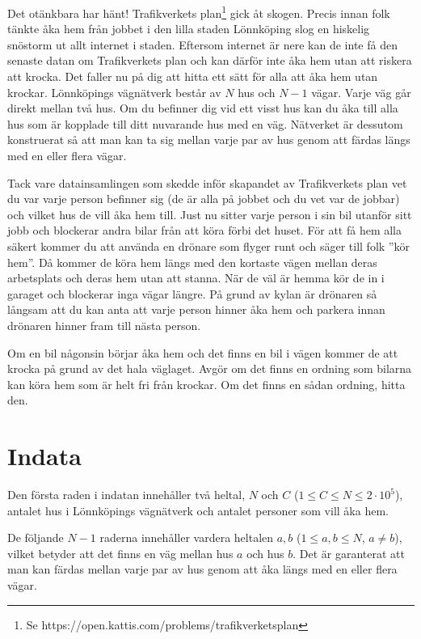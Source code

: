 \noindent
Det otänkbara har hänt! Trafikverkets plan\footnote{Se https://open.kattis.com/problems/trafikverketsplan} gick åt skogen. Precis innan folk tänkte åka hem från jobbet i den lilla staden Lönnköping slog en hiskelig snöstorm ut
allt internet i staden. Eftersom internet är nere kan de inte få den senaste datan om Trafikverkets plan och kan därför inte
åka hem utan att riskera att krocka.
Det faller nu på dig att hitta ett sätt för alla att åka hem utan krockar. Lönnköpings vägnätverk består av $N$ hus och $N-1$ vägar. Varje väg går direkt mellan två hus.
Om du befinner dig vid ett visst hus kan du åka till alla hus som är kopplade till ditt nuvarande hus med en väg. Nätverket är dessutom konstruerat så att
man kan ta sig mellan varje par av hus genom att färdas längs med en eller flera vägar.

Tack vare datainsamlingen som skedde inför skapandet av Trafikverkets plan vet du var varje person befinner sig
(de är alla på jobbet och du vet var de jobbar) och vilket hus de vill åka hem till. Just nu sitter varje person i sin bil utanför sitt jobb och blockerar andra bilar från att köra förbi det huset.
För att få hem alla säkert kommer du att använda en drönare som flyger runt och säger till folk ''kör hem''. Då kommer de köra hem längs med den kortaste vägen mellan deras arbetsplats
och deras hem utan att stanna. När de väl är hemma kör de in i garaget och blockerar inga vägar längre. På grund av kylan är drönaren så långsam att du kan anta
att varje person hinner åka hem och parkera innan drönaren hinner fram till nästa person.

Om en bil någonsin börjar åka hem och det finns en bil i vägen kommer de att krocka på grund av det hala väglaget. Avgör om det finns en ordning som bilarna kan
köra hem som är helt fri från krockar. Om det finns en sådan ordning, hitta den.

\section*{Indata}
Den första raden i indatan innehåller två heltal, $N$ och $C$ ($1 \le C \leq N \le 2 \cdot 10^5$), antalet hus i Lönnköpings vägnätverk
och antalet personer som vill åka hem. 

De följande $N-1$ raderna innehåller vardera heltalen $a,b$ ($1 \leq a,b \leq N$, $a \neq b$),
vilket betyder att det finns en väg mellan hus $a$ och hus $b$. Det är garanterat att man kan färdas
mellan varje par av hus genom att åka längs med en eller flera vägar.

